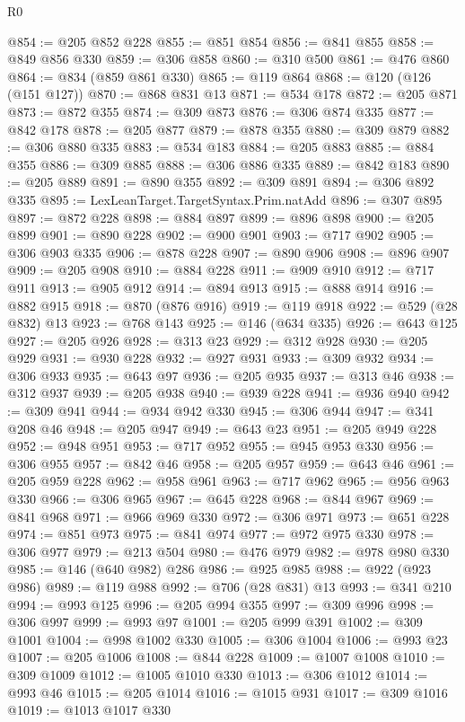 \begin{lexlean}{R0}
\begin{coremodule}
@854 := @205 @852 @228
@855 := @851 @854
@856 := @841 @855
@858 := @849 @856 @330
@859 := @306 @858
@860 := @310 @500
@861 := @476 @860
@864 := @834 (@859 @861 @330)
@865 := @119 @864
@868 := @120 (@126 (@151 @127))
@870 := @868 @831 @13
@871 := @534 @178
@872 := @205 @871
@873 := @872 @355
@874 := @309 @873
@876 := @306 @874 @335
@877 := @842 @178
@878 := @205 @877
@879 := @878 @355
@880 := @309 @879
@882 := @306 @880 @335
@883 := @534 @183
@884 := @205 @883
@885 := @884 @355
@886 := @309 @885
@888 := @306 @886 @335
@889 := @842 @183
@890 := @205 @889
@891 := @890 @355
@892 := @309 @891
@894 := @306 @892 @335
@895 := LexLeanTarget.TargetSyntax.Prim.natAdd
@896 := @307 @895
@897 := @872 @228
@898 := @884 @897
@899 := @896 @898
@900 := @205 @899
@901 := @890 @228
@902 := @900 @901
@903 := @717 @902
@905 := @306 @903 @335
@906 := @878 @228
@907 := @890 @906
@908 := @896 @907
@909 := @205 @908
@910 := @884 @228
@911 := @909 @910
@912 := @717 @911
@913 := @905 @912
@914 := @894 @913
@915 := @888 @914
@916 := @882 @915
@918 := @870 (@876 @916)
@919 := @119 @918
@922 := @529 (@28 @832) @13
@923 := @768 @143
@925 := @146 (@634 @335)
@926 := @643 @125
@927 := @205 @926
@928 := @313 @23
@929 := @312 @928
@930 := @205 @929
@931 := @930 @228
@932 := @927 @931
@933 := @309 @932
@934 := @306 @933
@935 := @643 @97
@936 := @205 @935
@937 := @313 @46
@938 := @312 @937
@939 := @205 @938
@940 := @939 @228
@941 := @936 @940
@942 := @309 @941
@944 := @934 @942 @330
@945 := @306 @944
@947 := @341 @208 @46
@948 := @205 @947
@949 := @643 @23
@951 := @205 @949 @228
@952 := @948 @951
@953 := @717 @952
@955 := @945 @953 @330
@956 := @306 @955
@957 := @842 @46
@958 := @205 @957
@959 := @643 @46
@961 := @205 @959 @228
@962 := @958 @961
@963 := @717 @962
@965 := @956 @963 @330
@966 := @306 @965
@967 := @645 @228
@968 := @844 @967
@969 := @841 @968
@971 := @966 @969 @330
@972 := @306 @971
@973 := @651 @228
@974 := @851 @973
@975 := @841 @974
@977 := @972 @975 @330
@978 := @306 @977
@979 := @213 @504
@980 := @476 @979
@982 := @978 @980 @330
@985 := @146 (@640 @982) @286
@986 := @925 @985
@988 := @922 (@923 @986)
@989 := @119 @988
@992 := @706 (@28 @831) @13
@993 := @341 @210
@994 := @993 @125
@996 := @205 @994 @355
@997 := @309 @996
@998 := @306 @997
@999 := @993 @97
@1001 := @205 @999 @391
@1002 := @309 @1001
@1004 := @998 @1002 @330
@1005 := @306 @1004
@1006 := @993 @23
@1007 := @205 @1006
@1008 := @844 @228
@1009 := @1007 @1008
@1010 := @309 @1009
@1012 := @1005 @1010 @330
@1013 := @306 @1012
@1014 := @993 @46
@1015 := @205 @1014
@1016 := @1015 @931
@1017 := @309 @1016
@1019 := @1013 @1017 @330

\end{coremodule}
\end{lexlean}
